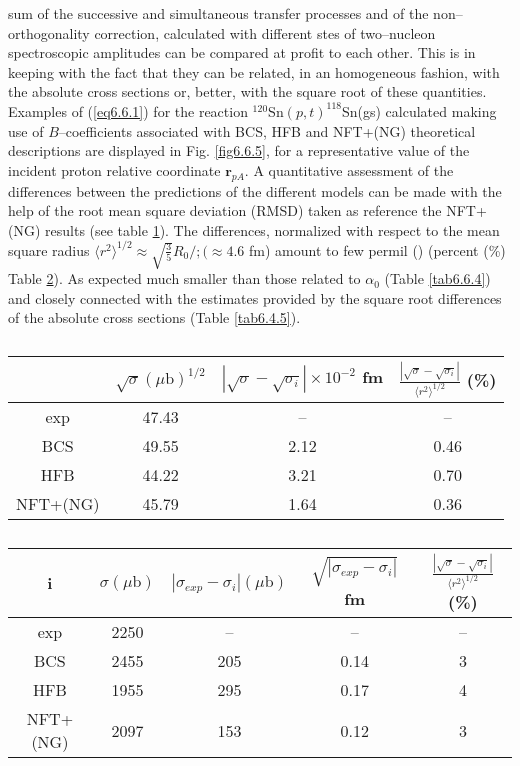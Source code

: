 sum of the successive and simultaneous transfer processes and of the non--orthogonality correction, calculated with different stes of two--nucleon spectroscopic amplitudes can be compared at profit to each other. This is in keeping with the fact that they can be related, in an homogeneous fashion, with the absolute cross sections or, better, with the square root of these quantities. Examples of (\ref{eq6.6.1}) for the reaction $^{120}$Sn$(p,t)^{118}$Sn(gs) calculated making use of $B$--coefficients associated with BCS, HFB and NFT+(NG) theoretical descriptions are displayed in Fig. \ref{fig6.6.5}, for a representative value of the incident proton relative coordinate $\mathbf r_{pA}$. A quantitative assessment of the differences between the predictions of the different models can be made with the help of the root mean square deviation (RMSD) taken as reference the NFT+(NG) results (see table \ref{tab6.6.2}). The differences, normalized with respect to the mean square radius $\langle r^2\rangle^{1/2}\approx\sqrt{\frac{3}{5}}R_0/;(\approx 4.6$ fm) amount to few permil (\textperthousand)   (percent (\%) Table \ref{tab6.6.3}). As expected much smaller than those related to $\alpha_0$ (Table \ref{tab6.6.4}) and closely connected with the estimates provided by the square root differences of the absolute cross sections (Table \ref{tab6.4.5}).

\begin{table}
\begin{center}
\begin{tabular}{|c|c|c|c|}
\hline
    & $\sqrt{\sigma}(\mu\text{b})^{1/2}$  & $\left|\sqrt{\sigma}-\sqrt{\sigma_i}\right|\times10^{-2}$ fm & $\frac{\left|\sqrt{\sigma}-\sqrt{\sigma_i}\right|}{\langle r^2\rangle^{1/2}}$ (\%) \\ 
 \hline 
 exp&47.43&--&--\\
 \hline
 BCS&49.55&2.12&0.46\\
 \hline
 HFB&44.22&3.21&0.70\\
 \hline
 NFT+(NG)&45.79&1.64&0.36\\
 \hline
\end{tabular}
\end{center}
\caption{}\label{tab6.6.2}
\end{table} 

\begin{table}
\begin{center}
\begin{tabular}{|c|c|c|c|c|}
\hline
   i& $\sigma (\mu\text{b})$& $\left|{\sigma_{exp}}-{\sigma_i}\right|(\mu\text{b})$ & $\sqrt{\left|{\sigma_{exp}}-{\sigma_i}\right|}$ fm& $\frac{\left|\sqrt{\sigma}-\sqrt{\sigma_i}\right|}{\langle r^2\rangle^{1/2}}$ (\%) \\ 
 \hline 
 exp&2250&--&--&--\\
 \hline
 BCS&2455&205&0.14&3\\
 \hline
 HFB&1955&295&0.17&4\\
 \hline
 NFT+(NG)&2097&153&0.12&3\\
 \hline
\end{tabular}
\end{center}
\caption{}\label{tab6.6.3}
\end{table} 


